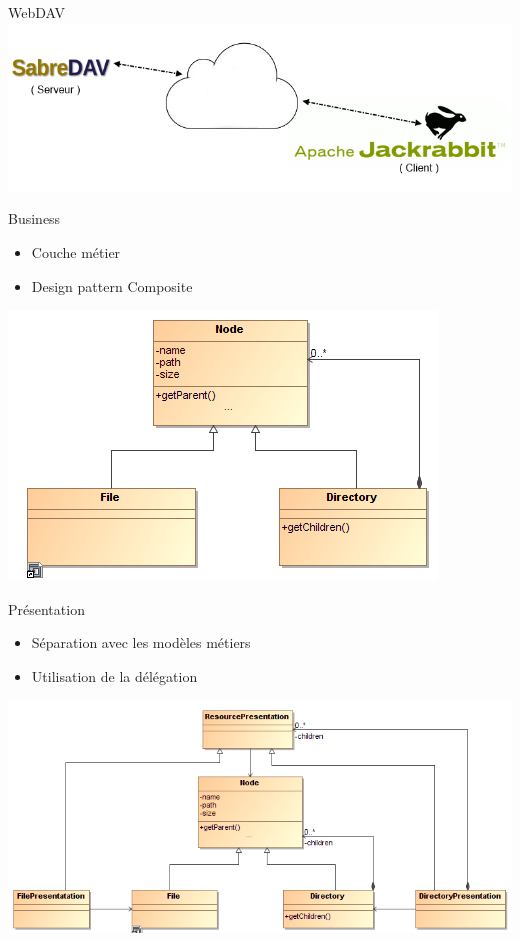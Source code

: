 	\begin{frame}{WebDAV}
\includegraphics[scale=0.5]{img/webdav}
\end{frame}	

\begin{frame}{Business}
	\begin{itemize}
		\item Couche métier
		\item Design pattern Composite
	\end{itemize}
	\hspace{3cm} \includegraphics[scale=0.6]{img/designComposite}
\end{frame}		
		
\begin{frame}{Présentation}
	\begin{itemize}
		\item Séparation avec les modèles métiers
		\item Utilisation de la délégation
	\end{itemize}
	\includegraphics[scale=0.5]{img/presentation}
\end{frame}	

